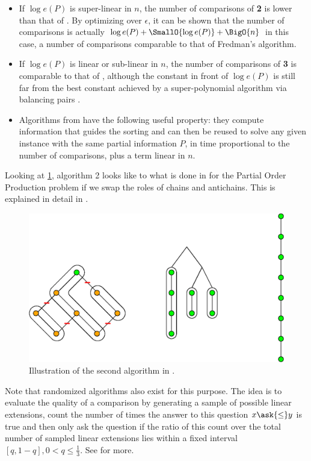 \begin{itemize}

\item If $\log e(P)$ is super-linear in $n$, the number of comparisons of
\cite{cardinal:2013} \textbf{2} is lower than that of \cite{kahn:1995}. By
optimizing over $\epsilon$, it can be shown that the number of comparisons is
actually $\log e(P) + \SmallO{\log e(P)} + \BigO{n}$ in this case, a number of
comparisons comparable to that of Fredman’s algorithm.

\item If $\log e(P)$ is linear or sub-linear in $n$, the number of comparisons
of \cite{cardinal:2013} \textbf{3} is comparable to that of
\cite{kahn:1995}, although the constant in front of $\log e(P)$ is still far
from the best constant achieved by a super-polynomial algorithm via balancing
pairs \cite{brightwell1995balancing, brightwell1999balanced}.

\item Algorithms from \cite{cardinal:2013} have the following useful
property: they compute information that guides the sorting and can then be
reused to solve any given instance with the same partial information $P$, in
time proportional to the number of comparisons, plus a term linear in $n$.

\end{itemize}


Looking at \ref{fig:supi/alg2}, algorithm 2 looks like to what is done in
\cite{cardinal:2010} for the Partial Order Production problem if we swap the roles
of chains and antichains. This is explained in detail in
\cite{DBLP:conf/birthday/CardinalF13}.


\begin{figure}
	\centering
	\includegraphics[height=0.2\textheight]{fig/supi/reduction:diag}
	\caption{\label{fig:supi/alg2} Illustration of the second algorithm in
\cite{cardinal:2013}.}
\end{figure}


Note that randomized algorithms also exist for this purpose. The idea is to
evaluate the quality of a comparison by generating a sample of possible linear
extensions, count the number of times the answer to this question \(x
\ask{\le} y\) is true and then only ask the question if the ratio of
this count over the total number of sampled linear extensions lies within a
fixed interval $[q, 1-q], 0 < q \le \frac{1}{3}$. See \citet*{huber2006fast} for
more.

